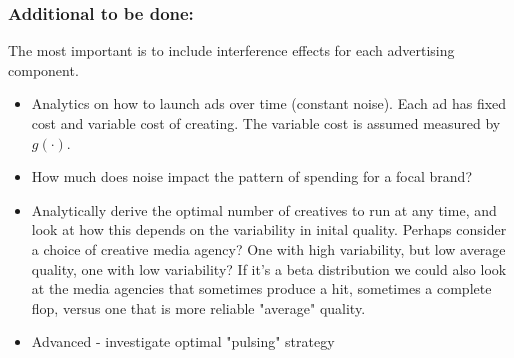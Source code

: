 \documentclass[letter,10pt]{article}
\begin{document}
\subsubsection{Additional to be done:}
The most important is to include interference effects for each advertising component.  
\begin{itemize}
\item Analytics on how to launch ads over time (constant noise).  Each ad has fixed
cost and variable cost of creating.  The variable cost is assumed measured by $g(\cdot)$.
\item How much does noise impact the pattern of spending for a focal brand?
\item Analytically derive the optimal number of creatives to run at any time, and
look at how this depends on the variability in inital quality.  Perhaps consider a 
choice of creative media agency?  One with high variability, but low average quality,
one with low variability?  If it's a beta distribution we could also look at the media agencies
that sometimes produce a hit, sometimes a complete flop, versus one that is more 
reliable "average" quality.  
\item Advanced - investigate optimal "pulsing" strategy
\end{itemize}
\end{document}
